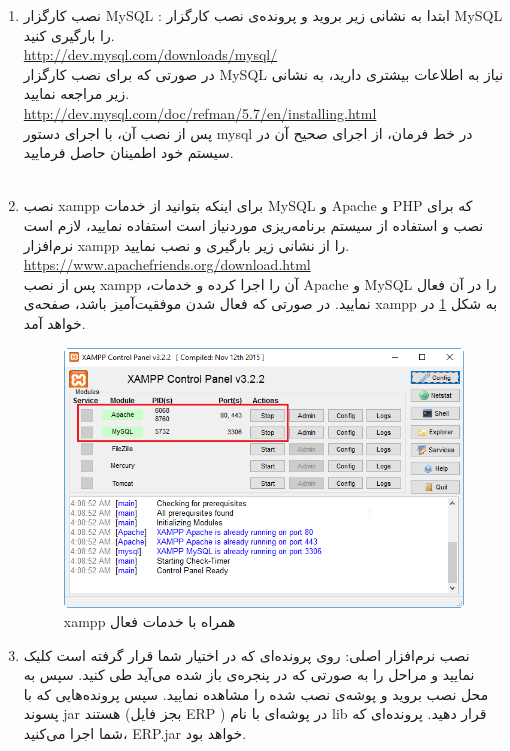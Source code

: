 \begin{enumerate}
	\item نصب کارگزار MySQL :
	ابتدا به نشانی زیر بروید و پرونده‌ی نصب کارگزار MySQL را بارگیری کنید.\\
\url{http://dev.mysql.com/downloads/mysql/}\\


در صورتی که برای نصب کارگزار MySQL نیاز به اطلاعات بیشتری دارید، به نشانی زیر مراجعه نمایید.\\
\url{http://dev.mysql.com/doc/refman/5.7/en/installing.html}\\

	پس از نصب آن، با اجرای دستور mysql در خط فرمان، از اجرای صحیح آن در سیستم خود اطمینان حاصل فرمایید.\\	\\	
	
	
	\item نصب xampp
	برای اینکه بتوانید از خدمات MySQL و Apache و PHP که برای نصب و استفاده از سیستم برنامه‌ریزی موردنیاز است استفاده نمایید، لازم است نرم‌افزار xampp را از نشانی زیر بارگیری و نصب نمایید.\\
\url{https://www.apachefriends.org/download.html}\\
	
	پس از نصب  xampp ،آن را اجرا کرده و خدمات Apache و MySQL را در آن فعال نمایید. در صورتی که فعال شدن موفقیت‌آمیز باشد، صفحه‌ی xampp به شکل
	\ref{f13}
	در خواهد آمد.
	
		\begin{figure}[H]
			\centering
			\includegraphics[scale=0.7]{img/install/xampp}
			\caption{xampp همراه با خدمات فعال}
			\label{f13}
		\end{figure}
		
		
	\item نصب نرم‌افزار اصلی: روی پرونده‌ای که در اختیار شما قرار گرفته است کلیک نمایید و مراحل را به صورتی که در پنجره‌ی باز شده می‌آید طی کنید.
سپس به محل نصب بروید و پوشه‌ی نصب شده را مشاهده نمایید. سپس پرونده‌هایی که با پسوند jar هستند (بجز فایل  ERP  ) در پوشه‌ای با نام lib قرار دهید. پرونده‌ای که شما اجرا می‌کنید، ERP.jar خواهد بود.


\end{enumerate}
